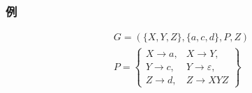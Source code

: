 \documentclass[dvipdfmx]{beamer}
\begin{document}

\begin{frame}
  \frametitle{例}

  \[
    \begin{array}{l}
      G=(\{X,Y,Z\},\{a,c,d\},P,Z) \\[10pt]
      P=\left\{\begin{array}{ll}
                 X\rightarrow a, & X\rightarrow Y,           \\
                 Y\rightarrow c, & Y\rightarrow \varepsilon, \\
                 Z\rightarrow d, & Z\rightarrow XYZ
               \end{array}
      \right\}
    \end{array}
  \]


\end{frame}
\end{document}
